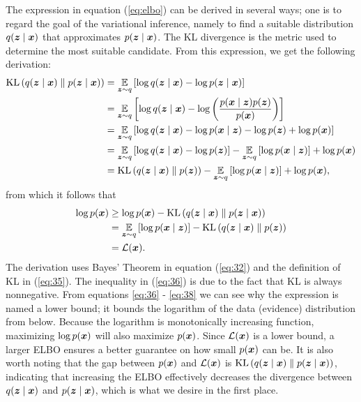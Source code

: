 The expression in equation (\ref{eq:elbo}) can be derived in several ways; one is to regard the goal of the variational inference, namely to find a suitable distribution $\q$ that approximates $\pzx$. The KL divergence is the metric used to determine the most suitable candidate. From this expression, we get the following derivation:
\begin{align}
    \kl{\q}{\pzx} &= \expectedvalue_{\ve{z}\sim q}\brts{\log \q - \log \pzx}\\
    &= \expectedvalue_{\ve{z}\sim q}\brts{\log \q - \log \prts{\frac{\pxz \pz}{\px}}}\label{eq:32}\\
    &= \expectedvalue_{\ve{z}\sim q}\brts{\log \q - \log \pxz - \log \pz + \log \px}\\
    &= \expectedvalue_{\ve{z}\sim q}\brts{\log \q - \log \pz}  - \expectedvalue_{\ve{z}\sim q}\brts{\log \pxz} + \log \px\\
    &= \kl{\q}{\pz}  - \expectedvalue_{\ve{z}\sim q}\brts{\log \pxz} + \log \px\label{eq:35},
\end{align}
from which it follows that
\begin{align}
    \log \px &\ge \log \px - \kl{\q}{\pzx}\label{eq:36}\\
             &= \expectedvalue_{\ve{z}\sim q}\brts{\log \pxz} - \kl{\q}{\pz}\\
             &= \mathcal{L}(\ve{x})\label{eq:38}.
\end{align}
The derivation uses Bayes' Theorem in equation (\ref{eq:32}) and the definition of KL in (\ref{eq:35}). The inequality in (\ref{eq:36}) is due to the fact that KL is always nonnegative. From equations \ref{eq:36} - \ref{eq:38} we can see why the expression is named a lower bound; it bounds the logarithm of the data (evidence) distribution from below. Because the logarithm is monotonically increasing function, maximizing $\log \px$ will also maximize $\px$. Since $\mathcal{L}(\ve{x})$ is a lower bound, a larger ELBO ensures a better guarantee on how small $\px$ can be. It is also worth noting that the gap between $\px$ and $\mathcal{L}(\ve{x})$ is $\kl{\q}{\pzx}$, indicating that increasing the ELBO effectively decreases the divergence between $\q$ and $\pzx$, which is what we desire in the first place.

